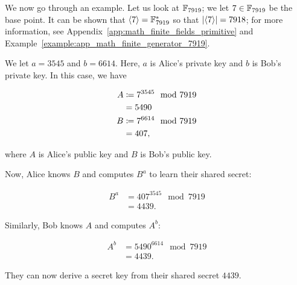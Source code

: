 \begin{example}[DH Example 1]

We now go through an example.
Let us look at $\mathbb{F}_{7919}$; we let $7\in\mathbb{F}_{7919}$ be the base point.
It can be shown that $\left\langle 7 \right\rangle = \mathbb{F}_{7919}^{*}$
so that $\left| \left\langle 7 \right\rangle \right| = 7918$;
for more information, see Appendix~\ref{app:math_finite_fields_primitive} and
Example~\ref{example:app_math_finite_generator_7919}.

We let $a = 3545$ and $b = 6614$.
Here, $a$ is Alice's private key and $b$ is Bob's private key.
In this case, we have

\begin{align}
    A &\coloneqq{} 7^{3545} \mod 7919 \nonumber\\
        &= 5490 \nonumber\\
    B &\coloneqq{} 7^{6614} \mod 7919 \nonumber\\
        &= 407,
\end{align}

\noindent
where $A$ is Alice's public key and $B$ is Bob's public key.

Now, Alice knows $B$ and computes $B^{a}$ to learn their \gls{shared secret}:

\begin{align}
    B^{a} &= 407^{3545} \mod 7919 \nonumber\\
        &= 4439.
\end{align}

\noindent
Similarly, Bob knows $A$ and computes $A^{b}$:

\begin{align}
    A^{b} &= 5490^{6614} \mod 7919 \nonumber\\
        &= 4439.
\end{align}

\noindent
They can now derive a secret key from their \gls{shared secret} $4439$.
\end{example}

